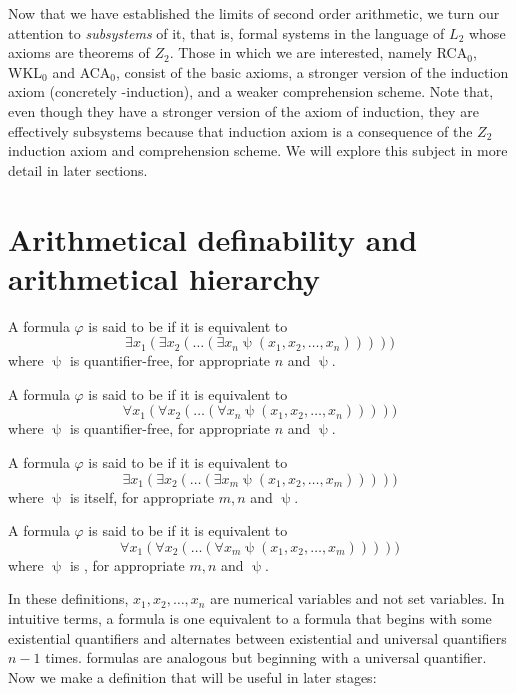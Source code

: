 \documentclass[../main.tex]{memoir}
\begin{document}
Now that we have established the limits of second order arithmetic, we turn our attention to \textit{subsystems} of it, that is, formal systems in the language of $L_2$ whose axioms are theorems of $Z_2$. Those in which we are interested, namely RCA$_0$, WKL$_0$ and ACA$_0$, consist of the basic axioms, a stronger version of the induction axiom (concretely \re-induction), and a weaker comprehension scheme. Note that, even though they have a stronger version of the axiom of induction, they are effectively subsystems because that induction axiom is a consequence of the $Z_2$ induction axiom and comprehension scheme. We will explore this subject in more detail in later sections.

\section{Arithmetical definability and arithmetical hierarchy}

\begin{definition}
  A formula $\varphi$ is said to be \re if it is equivalent to
  \[
    \exists x_1 (\exists x_2 (\ldots (\exists x_n \uppsi(x_1, x_2, \ldots, x_n)))))
  \]
  where $\uppsi$ is quantifier-free, for appropriate $n$ and $\uppsi$.
\end{definition}

\begin{definition}
  A formula $\varphi$ is said to be \core if it is equivalent to
  \[
    \forall x_1 (\forall x_2 (\ldots (\forall x_n \uppsi(x_1, x_2, \ldots, x_n)))))
  \]
  where $\uppsi$ is quantifier-free, for appropriate $n$ and $\uppsi$.
\end{definition}

\begin{definition}
  A formula $\varphi$ is said to be  if it is equivalent to
  \[
    \exists x_1 (\exists x_2 (\ldots (\exists x_m \uppsi(x_1, x_2, \ldots, x_m)))))
  \]
  where $\uppsi$ is  itself, for appropriate $m, n$ and $\uppsi$.
\end{definition}

\begin{definition}
  A formula $\varphi$ is said to be  if it is equivalent to
  \[
    \forall x_1 (\forall x_2 (\ldots (\forall x_m \uppsi(x_1, x_2, \ldots, x_m)))))
  \]
  where $\uppsi$ is , for appropriate $m, n$ and $\uppsi$.
\end{definition}

In these definitions, $x_1, x_2, \ldots, x_n$ are numerical variables and not set variables. In intuitive terms, a  formula is one equivalent to a formula that begins with some existential quantifiers and alternates between existential and universal quantifiers $n - 1$ times.  formulas are analogous but beginning with a universal quantifier. Now we make a definition that will be useful in later stages:
\end{document}
